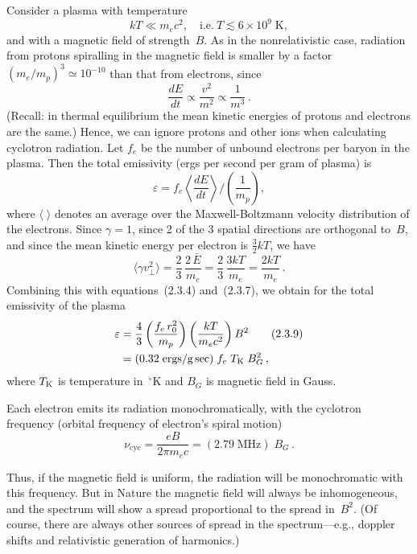 \medskip
Consider a plasma with temperature
\begin{equation}
kT \ll m_e c^2, \quad \text{i.e.}\ T \lesssim 6 \times 10^9\;\text{K},
\tag{2.3.5}
\end{equation}
and with a magnetic field of strength~$B$. As in the nonrelativistic case, radiation
from protons spiralling
in the magnetic field is smaller by a factor $(m_e/m_p)^3 \simeq 10^{-10}$ than that from
electrons, since
\begin{equation}
\frac{dE}{dt} \propto \frac{v^2}{m^2} \propto \frac{1}{m^3}\,.
\tag{2.3.6}
\end{equation}
(Recall: in thermal equilibrium the mean kinetic energies of protons and electrons
are the same.) Hence, we can ignore protons and other ions when calculating
cyclotron radiation. Let $f_e$ be the number of unbound electrons per baryon in
the plasma. Then the total emissivity (ergs per second per gram of plasma) is
\begin{equation}
\varepsilon = f_e \left\langle \frac{dE}{dt} \right\rangle
\bigg/\!\left(\frac{1}{m_p}\right),
\tag{2.3.7}
\end{equation}
where $\langle\;\rangle$ denotes an average over the Maxwell-Boltzmann velocity distribution
of the electrons. Since $\gamma = 1$, since 2 of the 3 spatial directions are orthogonal
to~$B$, and since the mean kinetic energy per electron is $\tfrac{3}{2}kT$, we have
\begin{equation}
\langle \gamma v_\perp^2 \rangle
= \frac{2}{3}\,\frac{2\,\bar{E}}{m_e}
= \frac{2}{3}\,\frac{3kT}{m_e}
= \frac{2kT}{m_e}\,.
\tag{2.3.8}
\end{equation}
Combining this with equations~(2.3.4) and~(2.3.7), we obtain for the total
emissivity of the plasma
\begin{align}
\varepsilon &= \frac{4}{3}\left(\frac{f_e\,r_0^2}{m_p}\right)
\left(\frac{kT}{m_e c^2}\right) B^2
\tag{2.3.9}\\
&= (0.32\;\text{ergs/g\,sec})\;f_e\;T_{\rm K}\;B_G^2\,,
\notag
\end{align}
where $T_{\rm K}$ is temperature in~${}^\circ$K and $B_G$ is magnetic field in Gauss.

Each electron emits its radiation monochromatically, with the cyclotron
frequency (orbital frequency of electron's spiral motion)
\begin{equation}
\nu_{\text{cyc}} = \frac{eB}{2\pi m_e c}
= (2.79\;\text{MHz})\;B_G\,.
\tag{2.3.10}
\end{equation}

Thus, if the magnetic field is uniform, the radiation will be monochromatic
with this frequency. But in Nature the magnetic field will always be inhomo\-geneous,
and the spectrum will show a spread proportional to the spread in~$B^2$.
(Of course, there are always other sources of spread in the spectrum---e.g., doppler
shifts and relativistic generation of harmonics.)
